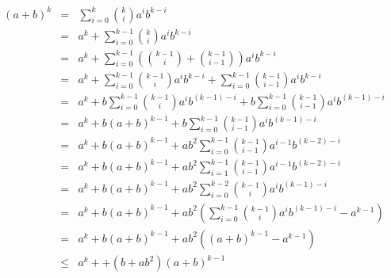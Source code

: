 \documentclass[12pt]{article}
\begin{document}
\begin{eqnarray*}
(a+b)^k & = & \sum_{i=0}^k \binom{k}{i}a^{i}b^{k-i} \\
  & = & a^k + \sum_{i=0}^{k-1} \binom{k}{i}a^{i}b^{k-i} \\
  & = & a^k + \sum_{i=0}^{k-1} \left(\binom{k-1}{i}+\binom{k-1}{i-1}\right)a^{i}b^{k-i} \\
  & = & a^k + \sum_{i=0}^{k-1} \binom{k-1}{i}a^{i}b^{k-i} 
	+\sum_{i=0}^{k-1}\binom{k-1}{i-1}a^{i}b^{k-i} \\
  & = & a^k + b\sum_{i=0}^{k-1} \binom{k-1}{i}a^{i}b^{(k-1)-i} 
	+ b\sum_{i=0}^{k-1}\binom{k-1}{i-1}a^{i}b^{(k-1)-i} \\
  & = & a^k + b(a+b)^{k-1}
	+ b\sum_{i=0}^{k-1}\binom{k-1}{i-1}a^{i}b^{(k-1)-i} \\
  & = & a^k + b(a+b)^{k-1}
	+ ab^2\sum_{i=0}^{k-1}\binom{k-1}{i-1}a^{i-1}b^{(k-2)-i} \\
  & = & a^k + b(a+b)^{k-1}
	+ ab^2\sum_{i=1}^{k-1}\binom{k-1}{i-1}a^{i-1}b^{(k-2)-i} \\
  & = & a^k + b(a+b)^{k-1}
	+ ab^2\sum_{i=0}^{k-2}\binom{k-1}{i}a^{i}b^{(k-1)-i} \\
  & = & a^k + b(a+b)^{k-1}
	+ ab^2\left(\sum_{i=0}^{k-1}\binom{k-1}{i}a^{i}b^{(k-1)-i} 
		- a^{k-1}\right) \\
  & = & a^k + b(a+b)^{k-1}
	+ ab^2((a+b)^{k-1} - a^{k-1}) \\
 & \le & a^k + 
	+ (b + ab^2)(a+b)^{k-1} \\
\end{eqnarray*}
\end{document}
